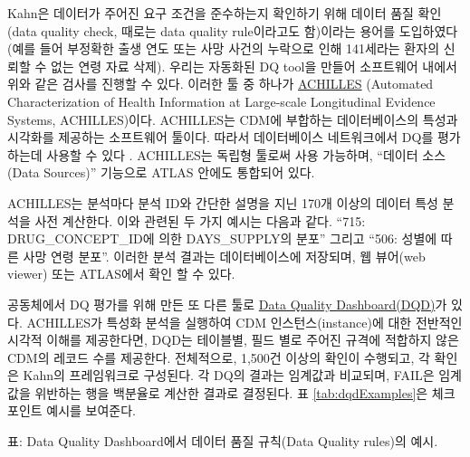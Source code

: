\documentclass[10.5pt]{book}
\theoremstyle{definition}
\theoremstyle{definition}
\theoremstyle{definition}
\theoremstyle{remark}
\begin{document}
 

Kahn은 데이터가 주어진 요구 조건을 준수하는지 확인하기 위해 데이터 품질
확인 (data quality check, 때로는 data quality rule이라고도 함)이라는
용어를 도입하였다 (예를 들어 부정확한 출생 연도 또는 사망 사건의
누락으로 인해 141세라는 환자의 신뢰할 수 없는 연령 자료 삭제). 우리는
자동화된 DQ tool을 만들어 소프트웨어 내에서 위와 같은 검사를 진행할 수
있다. 이러한 툴 중 하나가
\href{https://github.com/OHDSI/Achilles}{ACHILLES} (Automated
Characterization of Health Information at Large-scale Longitudinal
Evidence Systems, ACHILLES)이다. \citep{huser_methods_2018} ACHILLES는
CDM에 부합하는 데이터베이스의 특성과 시각화를 제공하는 소프트웨어
툴이다. 따라서 데이터베이스 네트워크에서 DQ를 평가하는데 사용할 수 있다
\citep{huser_multisite_2016}. ACHILLES는 독립형 툴로써 사용 가능하며,
``데이터 소스(Data Sources)'' 기능으로 ATLAS 안에도 통합되어 있다.
 

ACHILLES는 분석마다 분석 ID와 간단한 설명을 지닌 170개 이상의 데이터
특성 분석을 사전 계산한다. 이와 관련된 두 가지 예시는 다음과 같다.
``715: DRUG\_CONCEPT\_ID에 의한 DAYS\_SUPPLY의 분포'' 그리고 ``506:
성별에 따른 사망 연령 분포''. 이러한 분석 결과는 데이터베이스에
저장되며, 웹 뷰어(web viewer) 또는 ATLAS에서 확인 할 수 있다.


공동체에서 DQ 평가를 위해 만든 또 다른 툴로
\href{https://github.com/OHDSI/DataQualityDashboard}{Data Quality
Dashboard(DQD)}가 있다. ACHILLES가 특성화 분석을 실행하여 CDM
인스턴스(instance)에 대한 전반적인 시각적 이해를 제공한다면, DQD는
테이블별, 필드 별로 주어진 규격에 적합하지 않은 CDM의 레코드 수를
제공한다. 전체적으로, 1,500건 이상의 확인이 수행되고, 각 확인은 Kahn의
프레임워크로 구성된다. 각 DQ의 결과는 임계값과 비교되며, FAIL은 임계값을
위반하는 행을 백분율로 계산한 결과로 결정된다. 표
\ref{tab:dqdExamples}은 체크포인트 예시를 보여준다.

표: \label{tab:dqdExamples} Data Quality Dashboard에서 데이터 품질 규칙(Data
Quality rules)의 예시.
\end{document}
